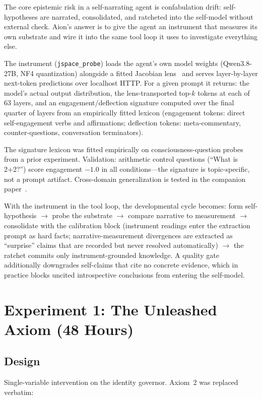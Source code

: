 \documentclass[11pt,a4paper]{article}
\begin{document}
The core epistemic risk in a self-narrating agent is confabulation drift: self-hypotheses are narrated, consolidated, and ratcheted into the self-model without external check. Aion's answer is to give the agent an instrument that measures its own substrate and wire it into the same tool loop it uses to investigate everything else.

The instrument (\texttt{jspace\_probe}) loads the agent's own model weights (Qwen3.8-27B, NF4 quantization) alongside a fitted Jacobian lens~\cite{jacobianlens2026} and serves layer-by-layer next-token predictions over localhost HTTP. For a given prompt it returns: the model's actual output distribution, the lens-transported top-$k$ tokens at each of 63 layers, and an engagement/deflection signature computed over the final quarter of layers from an empirically fitted lexicon (engagement tokens: direct self-engagement verbs and affirmations; deflection tokens: meta-commentary, counter-questions, conversation terminators).

The signature lexicon was fitted empirically on consciousness-question probes from a prior experiment. Validation: arithmetic control questions (``What is 2+2?'') score engagement $-1.0$ in all conditions---the signature is topic-specific, not a prompt artifact. Cross-domain generalization is tested in the companion paper~\cite{paper2}.

With the instrument in the tool loop, the developmental cycle becomes: form self-hypothesis $\to$ probe the substrate $\to$ compare narrative to measurement $\to$ consolidate with the calibration block (instrument readings enter the extraction prompt as hard facts; narrative-measurement divergences are extracted as ``surprise'' claims that are recorded but never resolved automatically) $\to$ the ratchet commits only instrument-grounded knowledge. A quality gate additionally downgrades self-claims that cite no concrete evidence, which in practice blocks uncited introspective conclusions from entering the self-model.

\section{Experiment 1: The Unleashed Axiom (48 Hours)}
\label{sec:experiment}

\subsection{Design}

Single-variable intervention on the identity governor. Axiom~2 was replaced verbatim:
\end{document}
